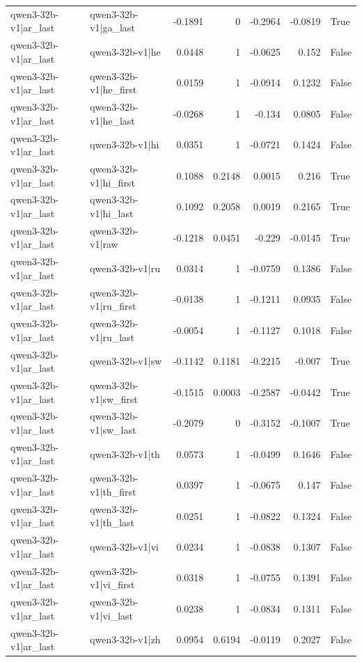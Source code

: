 \begin{table}
\begin{tabular}{l l r r r r l}
qwen3-32b-v1|ar_last & qwen3-32b-v1|ga_last & -0.1891 & 0 & -0.2964 & -0.0819 & True \\
qwen3-32b-v1|ar_last & qwen3-32b-v1|he & 0.0448 & 1 & -0.0625 & 0.152 & False \\
qwen3-32b-v1|ar_last & qwen3-32b-v1|he_first & 0.0159 & 1 & -0.0914 & 0.1232 & False \\
qwen3-32b-v1|ar_last & qwen3-32b-v1|he_last & -0.0268 & 1 & -0.134 & 0.0805 & False \\
qwen3-32b-v1|ar_last & qwen3-32b-v1|hi & 0.0351 & 1 & -0.0721 & 0.1424 & False \\
qwen3-32b-v1|ar_last & qwen3-32b-v1|hi_first & 0.1088 & 0.2148 & 0.0015 & 0.216 & True \\
qwen3-32b-v1|ar_last & qwen3-32b-v1|hi_last & 0.1092 & 0.2058 & 0.0019 & 0.2165 & True \\
qwen3-32b-v1|ar_last & qwen3-32b-v1|raw & -0.1218 & 0.0451 & -0.229 & -0.0145 & True \\
qwen3-32b-v1|ar_last & qwen3-32b-v1|ru & 0.0314 & 1 & -0.0759 & 0.1386 & False \\
qwen3-32b-v1|ar_last & qwen3-32b-v1|ru_first & -0.0138 & 1 & -0.1211 & 0.0935 & False \\
qwen3-32b-v1|ar_last & qwen3-32b-v1|ru_last & -0.0054 & 1 & -0.1127 & 0.1018 & False \\
qwen3-32b-v1|ar_last & qwen3-32b-v1|sw & -0.1142 & 0.1181 & -0.2215 & -0.007 & True \\
qwen3-32b-v1|ar_last & qwen3-32b-v1|sw_first & -0.1515 & 0.0003 & -0.2587 & -0.0442 & True \\
qwen3-32b-v1|ar_last & qwen3-32b-v1|sw_last & -0.2079 & 0 & -0.3152 & -0.1007 & True \\
qwen3-32b-v1|ar_last & qwen3-32b-v1|th & 0.0573 & 1 & -0.0499 & 0.1646 & False \\
qwen3-32b-v1|ar_last & qwen3-32b-v1|th_first & 0.0397 & 1 & -0.0675 & 0.147 & False \\
qwen3-32b-v1|ar_last & qwen3-32b-v1|th_last & 0.0251 & 1 & -0.0822 & 0.1324 & False \\
qwen3-32b-v1|ar_last & qwen3-32b-v1|vi & 0.0234 & 1 & -0.0838 & 0.1307 & False \\
qwen3-32b-v1|ar_last & qwen3-32b-v1|vi_first & 0.0318 & 1 & -0.0755 & 0.1391 & False \\
qwen3-32b-v1|ar_last & qwen3-32b-v1|vi_last & 0.0238 & 1 & -0.0834 & 0.1311 & False \\
qwen3-32b-v1|ar_last & qwen3-32b-v1|zh & 0.0954 & 0.6194 & -0.0119 & 0.2027 & False \\

\end{tabular}
\end{table}
